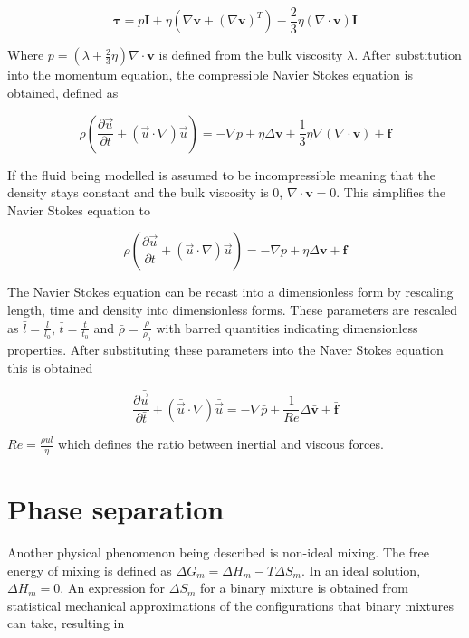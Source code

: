 \begin{equation}
    \mathbf{\tau} = p\mathbf{I} + \eta(\nabla \mathbf{v} + (\nabla \mathbf{v})^T) - \frac{2}{3}\eta(\nabla \cdot \mathbf{v})\mathbf{I}
\end{equation}

Where $p = (\lambda + \frac{2}{3}\eta)\nabla \cdot \mathbf{v}$ is defined from the bulk viscosity $\lambda$. After substitution into the momentum equation, the compressible 
Navier Stokes equation is obtained, defined as

\begin{equation}
    \rho (\frac{\partial\vec{u}}{\partial t} + (\vec{u}\cdot\nabla)\vec{u}) = -\nabla p + \eta \Delta \mathbf{v} + \frac{1}{3}\eta \nabla(\nabla \cdot \mathbf{v}) + \mathbf{f}
\end{equation}

If the fluid being modelled is assumed to be incompressible meaning that the density stays constant and the bulk viscosity is 0, $\nabla \cdot \mathbf{v} = 0$. This simplifies
the Navier Stokes equation to

\begin{equation}
    \rho (\frac{\partial\vec{u}}{\partial t} + (\vec{u}\cdot\nabla)\vec{u}) = -\nabla p + \eta \Delta \mathbf{v} + \mathbf{f}
\end{equation}

The Navier Stokes equation can be recast into a dimensionless form by rescaling length, time and density into dimensionless forms. These parameters are rescaled as 
$\bar{l} = \frac{l}{l_0}$, $\bar{t} = \frac{t}{t_0}$ and $\bar{\rho} = \frac{\rho}{\rho_0}$ with barred quantities indicating dimensionless properties. After substituting
these parameters into the Naver Stokes equation this is obtained

\begin{equation}
    \frac{\partial \bar{\vec{u}}}{\partial \bar{t}} + (\bar{\vec{u}} \cdot\nabla)\bar{\vec{u}} = -\nabla \bar{p} + \frac{1}{Re} \Delta \mathbf{\bar{v}} + \bar{\mathbf{f}}
\end{equation}

$Re = \frac{\rho u l}{\eta}$ which defines the ratio between inertial and viscous forces. 

\section{Phase separation}

Another physical phenomenon being described is non-ideal mixing. The free energy of mixing
is defined as $\Delta G_m = \Delta H_m - T \Delta S_m$. In an ideal solution, $\Delta H_m = 0$. An expression for $\Delta S_m$ for a binary mixture is obtained from statistical mechanical 
approximations of the configurations that binary mixtures can take, resulting in 

